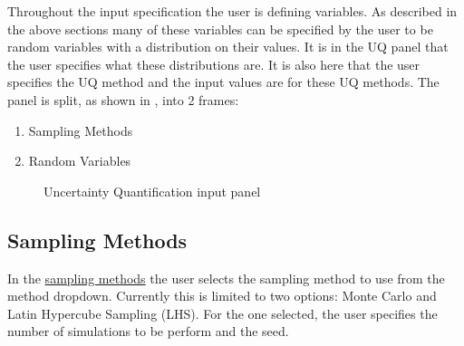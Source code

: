 Throughout the input specification the user is defining variables. As
described in the above sections many of these variables can be
specified by the user to be random variables with a distribution on
their values. It is in the UQ panel that the user specifies what these
distributions are.
It is also here that the user specifies the UQ method and the input
values are for these UQ methods.  The panel is split, as shown
in , into 2 frames:

\begin{enumerate}
\item Sampling Methods 
\item Random Variables
\end{enumerate}

\begin{figure}[!htbp]
  \caption{Uncertainty Quantification input panel}
  \label{fig:figure10}
\end{figure}

\subsection{Sampling Methods}
In the \href{https://dakota.sandia.gov//sites/default/files/docs/6.9/html-ref/methods-sampling.html}{sampling methods} the user selects the sampling 
method to use from the method dropdown. Currently this is limited to 
two options: Monte Carlo and Latin Hypercube Sampling (LHS). For the 
one selected, the user specifies the number of simulations to be 
perform and the seed.

